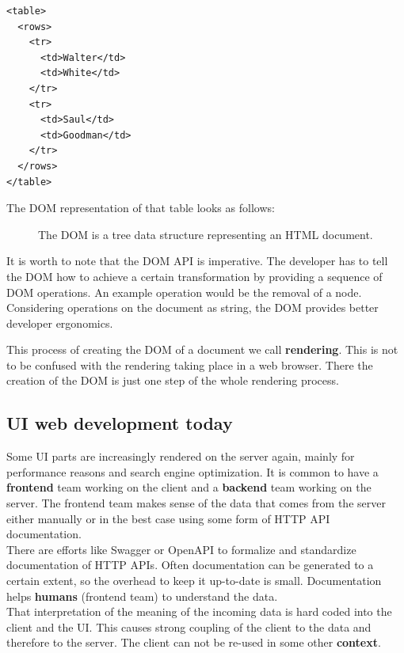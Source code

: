 \lstset{language=XML}
\begin{lstlisting}[caption=HTML document of a table, label=htmloftable]
<table>
  <rows>
    <tr>
      <td>Walter</td>
      <td>White</td>
    </tr>
    <tr>
      <td>Saul</td>
      <td>Goodman</td>
    </tr>
  </rows>
</table>
\end{lstlisting}

The DOM representation of that table looks as follows:

\begin{figure}[!htb]
  \caption{The DOM is a tree data structure representing an HTML document.}
\end{figure}

It is worth to note that the DOM API is imperative. The developer has to tell the DOM how to achieve a certain transformation by providing a sequence of DOM operations. An example operation would be the removal of a node. Considering operations on the document as string, the DOM provides better developer ergonomics.

This process of creating the DOM of a document we call \textbf{rendering}. This is not to be confused with the rendering taking place in a web browser. There the creation of the DOM is just one step of the whole rendering process.

\subsection{UI web development today}\label{uidevelopmenttoday}
Some UI parts are increasingly rendered on the server again, mainly for performance reasons and search engine optimization. It is common to have a \textbf{frontend} team working on the client and a \textbf{backend} team working on the server. The frontend team makes sense of the data that comes from the server either manually or in the best case using some form of HTTP API documentation.
\\ There are efforts like Swagger or OpenAPI to formalize and standardize documentation of HTTP APIs. Often documentation can be generated to a certain extent, so the overhead to keep it up-to-date is small. Documentation helps \textbf{humans} (frontend team) to understand the data.
\\ That interpretation of the meaning of the incoming data is hard coded into the client and the UI. This causes strong coupling of the client to the data and therefore to the server. The client can not be re-used in some other \textbf{context}.

